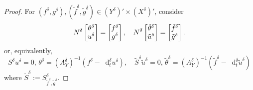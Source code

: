 \documentclass{amsart}
\numberwithin{equation}{section}
\newcommand{\NN}{N}
\newcommand{\1}{\mathbb 1}
\newcommand*\diff{\mathop{}\!\mathrm{d}}
\begin{document}
\begin{proof} For $(f^\delta,g^\delta), (\tilde{f}^\delta,\tilde{g}^\delta) \in (Y^\delta)' \times (X^\delta)'$,  consider
$$
\NN^\delta \left[\begin{array}{@{}c@{}} \theta^\delta \\ u^\delta \end{array}\right]=\left[\begin{array}{@{}c@{}} f^\delta \\ g^\delta \end{array}\right], \quad
\NN^\delta \left[\begin{array}{@{}c@{}} \tilde{\theta}^\delta \\ \tilde{u}^\delta \end{array}\right]=\left[\begin{array}{@{}c@{}} \tilde{f}^\delta \\ \tilde{g}^\delta \end{array}\right].
$$
or, equivalently,
$$
S^\delta u^\delta=0,\, \theta^\delta=(A_Y^\delta)^{-1}(f^\delta-\diff_t^\delta u^\delta),\quad
\tilde{S}^\delta \tilde{u}^\delta=0,\, \tilde{\theta}^\delta=(A_Y^\delta)^{-1}(\tilde{f}^\delta-\diff_t^\delta \tilde{u}^\delta)
$$
where $\tilde{S}^\delta:=S_{\tilde{f}^\delta,\tilde{g}^\delta}^\delta$.


\end{proof}
\end{document}
